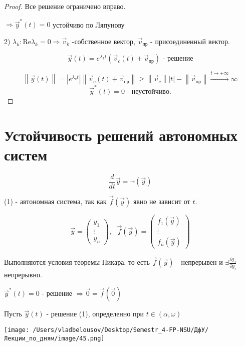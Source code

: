\documentclass[12pt, a4paper]{report}
\begin{document}
\begin{proof}
    Все решение ограничено вправо. 
    
    \(\Rightarrow \vec{y } ^* (t ) = 0  \)  устойчиво по Ляпунову

    2) \( \lambda_k: \mathrm{Re } \lambda_k = 0 \Rightarrow \vec{v } _k   \)  -собственное  вектор, \( \vec{v } _{\text{пр} }   \) - присоединенный вектор. 

    \[ \vec{y } (t ) = e^{ \lambda_k t } (\vec{v } _c (t ) + \vec{v } _{\text{пр}}  ) \text{ - решение}  \] 

    \[ \left\lVert \vec{y } (t) \right\rVert  = \left\lvert e^{ \lambda_k t }   \right\rvert \left\lVert \vec{v } _c (t ) + \vec{v } _{\text{пр}}   \right\rVert \ge  \left\lVert \vec{v } _c  \right\rVert \left\lvert t  \right\rvert - \left\lVert \vec{v  } _{\text{пр}}  \right\rVert   \xrightarrow{ t \to + \infty      } \infty   \] 
    \[ \vec{y } ^* (t ) = 0 \text{ - неустойчиво.}  \] 

\end{proof}

\section{Устойчивость решений автономных систем}

\[ \frac{d}{dt }  \vec{y } = \vec{ } (\vec{y } ) \tag{1} \] 

(1) - автономная система, так как \( \vec{f } (\vec{y } ) \) явно не зависит от \( t \). 

\[ \vec{y } = \begin{pmatrix}
y_1     \\
\vdots\\
y_n
\end{pmatrix} , \text{ }  \vec{f } (\vec{y }  ) = \begin{pmatrix}
f_1(\vec{y } ) \\
\vdots\\
f_n (\vec{y } ) 
\end{pmatrix} \] 

Выполняются условия теоремы Пикара, то есть \( \vec{f } (\vec{y} ) \) - непрерывен и \( \exists \displaystyle  \frac{\partial  f_i }{\partial  y_i}  \) - непрерывно.

\( \vec{y} ^* (t ) = 0  \) -  решение \( \Rightarrow \vec{0 }  = \vec{f } (\vec{0} )  \)

Пусть \( \vec{y } (t) \) - решение (1), определенно  при \( t \in  (\alpha , \omega) \) 

\begin{center}
    \texttt{[image: /Users/vladbelousov/Desktop/Semestr\_4-FP-NSU/ДфУ/Лекции\_по\_дням/image/45.png]}
\end{center}
\end{document}
